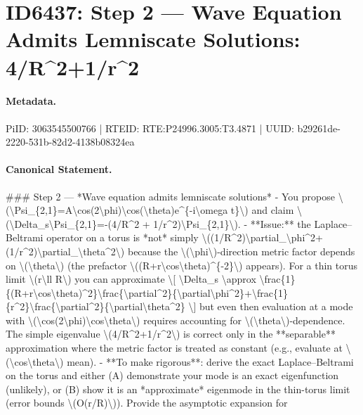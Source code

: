 \section*{ID6437: Step 2 — Wave Equation Admits Lemniscate Solutions: 4/R\textasciicircum{}2+1/r\textasciicircum{}2}
\paragraph{Metadata.}
PiID: 3063545500766 | RTEID: RTE:P24996.3005:T3.4871 | UUID: b29261de-2220-531b-82d2-4138b08324ea

\paragraph{Canonical Statement.}
\#\#\# Step 2 — *Wave equation admits lemniscate solutions* - You propose \textbackslash{}(\textbackslash{}Psi\_\{2,1\}=A\textbackslash{}cos(2\textbackslash{}phi)\textbackslash{}cos(\textbackslash{}theta)e\textasciicircum{}\{-i\textbackslash{}omega t\}\textbackslash{}) and claim \textbackslash{}(\textbackslash{}Delta\_s\textbackslash{}Psi\_\{2,1\}=-(4/R\textasciicircum{}2 + 1/r\textasciicircum{}2)\textbackslash{}Psi\_\{2,1\}\textbackslash{}). - **Issue:** the Laplace–Beltrami operator on a torus is *not* simply \textbackslash{}((1/R\textasciicircum{}2)\textbackslash{}partial\_\textbackslash{}phi\textasciicircum{}2+(1/r\textasciicircum{}2)\textbackslash{}partial\_\textbackslash{}theta\textasciicircum{}2\textbackslash{}) because the \textbackslash{}(\textbackslash{}phi\textbackslash{})-direction metric factor depends on \textbackslash{}(\textbackslash{}theta\textbackslash{}) (the prefactor \textbackslash{}((R+r\textbackslash{}cos\textbackslash{}theta)\textasciicircum{}\{-2\}\textbackslash{}) appears). For a thin torus limit \textbackslash{}(r\textbackslash{}ll R\textbackslash{}) you can approximate \textbackslash{}[ \textbackslash{}Delta\_s \textbackslash{}approx \textbackslash{}frac\{1\}\{(R+r\textbackslash{}cos\textbackslash{}theta)\textasciicircum{}2\}\textbackslash{}frac\{\textbackslash{}partial\textasciicircum{}2\}\{\textbackslash{}partial\textbackslash{}phi\textasciicircum{}2\}+\textbackslash{}frac\{1\}\{r\textasciicircum{}2\}\textbackslash{}frac\{\textbackslash{}partial\textasciicircum{}2\}\{\textbackslash{}partial\textbackslash{}theta\textasciicircum{}2\} \textbackslash{}] but even then evaluation at a mode with \textbackslash{}(\textbackslash{}cos(2\textbackslash{}phi)\textbackslash{}cos\textbackslash{}theta\textbackslash{}) requires accounting for \textbackslash{}(\textbackslash{}theta\textbackslash{})-dependence. The simple eigenvalue \textbackslash{}(4/R\textasciicircum{}2+1/r\textasciicircum{}2\textbackslash{}) is correct only in the **separable** approximation where the metric factor is treated as constant (e.g., evaluate at \textbackslash{}(\textbackslash{}cos\textbackslash{}theta\textbackslash{}) mean). - **To make rigorous**: derive the exact Laplace–Beltrami on the torus and either (A) demonstrate your mode is an exact eigenfunction (unlikely), or (B) show it is an *approximate* eigenmode in the thin-torus limit (error bounds \textbackslash{}(O(r/R)\textbackslash{})). Provide the asymptotic expansion for 